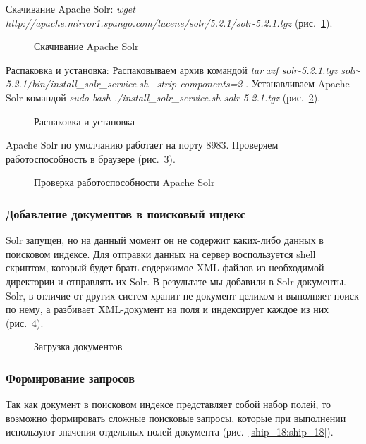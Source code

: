 Скачивание Apache Solr:
\textit
{
wget http://apache.mirror1.spango.com/lucene/solr/5.2.1/solr-5.2.1.tgz
} (рис.~\ref{ship_13:ship_13}).

\begin{figure}[h!]
\caption{Скачивание Apache Solr}
\label{ship_13:ship_13}
\end{figure}

Распаковка и установка:
Распаковываем архив командой 
\textit
{
tar xzf solr-5.2.1.tgz solr-5.2.1/bin/install\_solr\_service.sh --strip-components=2
}.
Устанавливаем Apache Solr командой 
\textit
{
sudo bash ./install\_solr\_service.sh solr-5.2.1.tgz
} (рис.~\ref{ship_14:ship_14}).
\begin{figure}[h!]
\caption{Распаковка и установка}
\label{ship_14:ship_14}
\end{figure}

Apache Solr по умолчанию работает на порту 8983. Проверяем работоспособность в браузере (рис.~\ref{ship_15:ship_15}).

\begin{figure}[h!]
\caption{Проверка работоспособности Apache Solr}
\label{ship_15:ship_15}
\end{figure}

\subsubsection{Добавление документов в поисковый индекс}

Solr запущен, но на данный момент он не содержит каких-либо данных в поисковом индексе. 
Для отправки данных на сервер воспользуется shell скриптом, который будет брать содержимое XML файлов из необходимой директории и отправлять их Solr. В результате мы добавили в Solr документы. Solr, в отличие от других систем хранит не документ целиком и выполняет поиск по нему, а разбивает XML-документ на поля и индексирует каждое из них  (рис.~\ref{ship_16:ship_16}).

\begin{figure}[h!]
\caption{Загрузка документов}
\label{ship_16:ship_16}
\end{figure}

\subsubsection{Формирование запросов}
Так как документ в поисковом индексе представляет собой набор полей, то возможно формировать сложные поисковые запросы, которые при выполнении используют значения отдельных полей документа (рис.~\ref{ship_18:ship_18}). 

